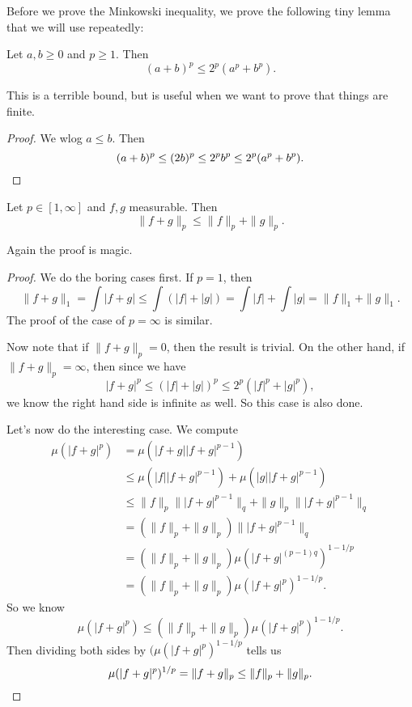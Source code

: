 \documentclass[a4paper]{article}
\begin{document}
Before we prove the Minkowski inequality, we prove the following tiny lemma that we will use repeatedly:
\begin{lemma}
  Let $a, b \geq 0$ and $p \geq 1$. Then
  \[
    (a + b)^p \leq 2^p(a^p + b^p).
  \]
\end{lemma}
This is a terrible bound, but is useful when we want to prove that things are finite.

\begin{proof}
  We wlog $a \leq b$. Then
  \[
    (a + b)^p \leq (2b)^p \leq 2^p b^p \leq 2^p(a^p + b^p).\qedhere
  \]
\end{proof}
\begin{thm}
  Let $p \in [1, \infty]$ and $f, g$ measurable. Then
  \[
    \|f + g\|_p \leq \|f\|_p + \|g\|_p.
  \]
\end{thm}

Again the proof is magic.
\begin{proof}
  We do the boring cases first. If $p = 1$, then
  \[
    \|f + g\|_1 = \int |f + g| \leq \int (|f| + |g|) = \int |f| + \int |g| = \|f\|_1 + \|g\|_1.
  \]
  The proof of the case of $p = \infty$ is similar.

  Now note that if $\|f + g\|_p = 0$, then the result is trivial. On the other hand, if $\|f + g\|_p = \infty$, then since we have
  \[
    |f + g|^p \leq (|f| + |g|)^p \leq 2^p(|f|^p + |g|^p),
  \]
  we know the right hand side is infinite as well. So this case is also done.

  Let's now do the interesting case. We compute
  \begin{align*}
    \mu(|f + g|^p) &= \mu(|f + g| |f + g|^{p - 1}) \\
    &\leq \mu(|f||f + g|^{p - 1}) + \mu(|g||f + g|^{p - 1})\\
    &\leq \|f\|_p \||f + g|^{p - 1}\|_q + \|g\|_p \||f + g|^{p - 1}\|_q\\
    &= (\|f\|_p + \|g\|_p) \||f + g|^{p - 1}\|_q\\
    &= (\|f\|_p + \|g\|_p) \mu(|f + g|^{(p - 1)q})^{1 - 1/p}\\
    &= (\|f\|_p + \|g\|_p) \mu(|f + g|^p)^{1 - 1/p}.
  \end{align*}
  So we know
  \[
    \mu(|f + g|^p) \leq (\|f\|_p + \|g\|_p) \mu(|f + g|^p)^{1 - 1/p}.
  \]
  Then dividing both sides by $(\mu(|f + g|^p)^{1 - 1/p}$ tells us
  \[
    \mu(|f + g|^p)^{1/p} = \|f + g\|_p \leq \|f\|_p + \|g\|_p.\qedhere
  \]
\end{proof}
\end{document}
